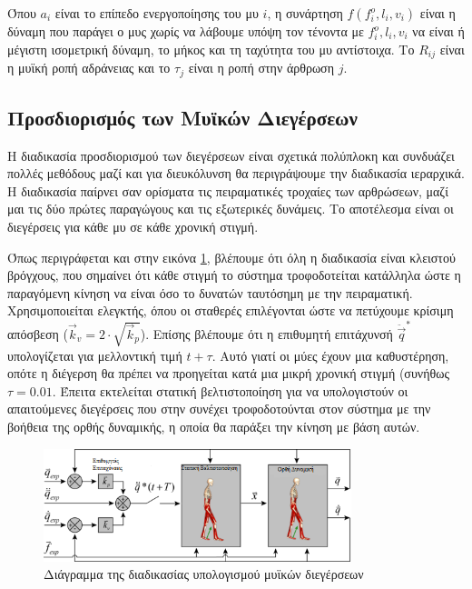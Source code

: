 Όπου $a_i$ είναι το επίπεδο ενεργοποίησης του μυ $i$, η συνάρτηση $f(f^{o}_{i}, l_{i}, v_{i})$ είναι η δύναμη που παράγει ο μυς χωρίς να λάβουμε υπόψη τον τένοντα με $f^{o}_{i}, l_{i}, v_{i}$ να είναι ή μέγιστη ισομετρική δύναμη, το μήκος και τη ταχύτητα του μυ αντίστοιχα. Το $R_{ij}$ είναι η μυϊκή ροπή αδράνειας και το $\tau_{j}$ είναι η ροπή στην άρθρωση $j$.

\subsection{Προσδιορισμός των Μυϊκών Διεγέρσεων}

Η διαδικασία προσδιορισμού των διεγέρσεων είναι σχετικά πολύπλοκη και συνδυάζει πολλές μεθόδους μαζί και για διευκόλυνση θα περιγράψουμε την διαδικασία ιεραρχικά. Η διαδικασία παίρνει σαν ορίσματα τις πειραματικές τροχαίες των αρθρώσεων, μαζί μαι τις δύο πρώτες παραγώγους και τις εξωτερικές δυνάμεις. Το αποτέλεσμα είναι οι διεγέρσεις για κάθε μυ σε κάθε χρονική στιγμή.

Όπως περιγράφεται και στην εικόνα \ref{fig:cmc-diagram}, βλέπουμε ότι όλη η διαδικασία είναι κλειστού βρόγχους, που σημαίνει ότι κάθε στιγμή το σύστημα τροφοδοτείται κατάλληλα ώστε η παραγόμενη κίνηση να είναι όσο το δυνατών ταυτόσημη με την πειραματική. Χρησιμοποιείται  ελεγκτής, όπου οι σταθερές επιλέγονται ώστε να πετύχουμε κρίσιμη απόσβεση ($\overrightarrow{k}_v = 2 \cdot \sqrt{\overrightarrow{k}_p}$). Επίσης βλέπουμε ότι η επιθυμητή επιτάχυνσή $\ddot{\overrightarrow{q}}^{*}$ υπολογίζεται για μελλοντική τιμή $t + \tau $. Αυτό γιατί οι μύες έχουν μια καθυστέρηση, οπότε η διέγερση θα πρέπει να προηγείται κατά μια μικρή χρονική στιγμή (συνήθως $\tau = 0.01$. Έπειτα εκτελείται στατική βελτιστοποίηση για να υπολογιστούν οι απαιτούμενες διεγέρσεις που στην συνέχει τροφοδοτούνται στον σύστημα με την βοήθεια της ορθής δυναμικής, η οποία θα παράξει την κίνηση με βάση αυτών.

\begin{figure}[H]
    \centering
    \includegraphics[width=0.8\textwidth, keepaspectratio]{fig/cmc-diagram.png}
    \caption{Διάγραμμα της διαδικασίας υπολογισμού μυϊκών διεγέρσεων \cite{thelen06}}
    \label{fig:cmc-diagram}
\end{figure}

